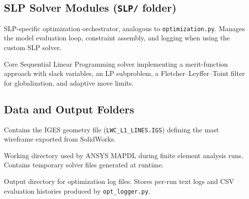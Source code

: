 \subsection*{SLP Solver Modules (\texttt{SLP/} folder)}

\begin{description}[style=nextline, leftmargin=2.5cm]

    \item[\texttt{SLP/optimization\_SLP.py}]
    SLP-specific optimization orchestrator, analogous to \texttt{optimization.py}.
    Manages the model evaluation loop, constraint assembly, and logging when using the custom SLP solver.

    \item[\texttt{SLP/SLP.py}]
    Core Sequential Linear Programming solver implementing a merit-function approach with slack variables, an LP subproblem, a Fletcher--Leyffer--Toint filter for globalization, and adaptive move limits.

\end{description}

\subsection*{Data and Output Folders}

\begin{description}[style=nextline, leftmargin=2.5cm]

    \item[\texttt{IGS/}]
    Contains the IGES geometry file (\texttt{LWC\_L1\_LINES.IGS}) defining the mast wireframe exported from SolidWorks.

    \item[\texttt{Ansout/}]
    Working directory used by ANSYS MAPDL during finite element analysis runs. Contains temporary solver files generated at runtime.

    \item[\texttt{Optimization\_Logs/}]
    Output directory for optimization log files. Stores per-run text logs and CSV evaluation histories produced by \texttt{opt\_logger.py}.

\end{description}
